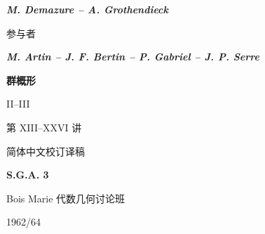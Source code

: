 

\frontmatter
\begin{titlepage}
\centering
\vspace*{15mm}
{\Large\bfseries\itshape M. Demazure -- A. Grothendieck\par}
\vspace{5mm}
{\small 参与者\par}
\vspace{3mm}
{\large\bfseries\itshape M. Artin -- J. F. Bertin -- P. Gabriel -- J. P. Serre\par}
\vfill
{\fontsize{36}{45}\selectfont\bfseries 群概形\par}
\vspace{8mm}
{\Huge II--III\par}
\vspace{12mm}
{\large 第 XIII--XXVI 讲\par}
\vspace{4mm}
{\small 简体中文校订译稿\par}
\vfill
{\Huge\bfseries S.G.A. 3\par}
\vspace{4mm}
{\large Bois Marie 代数几何讨论班\par}
\vspace{4mm}
{\Large 1962/64\par}
\vspace*{15mm}
\end{titlepage}
\tableofcontents
\mainmatter


